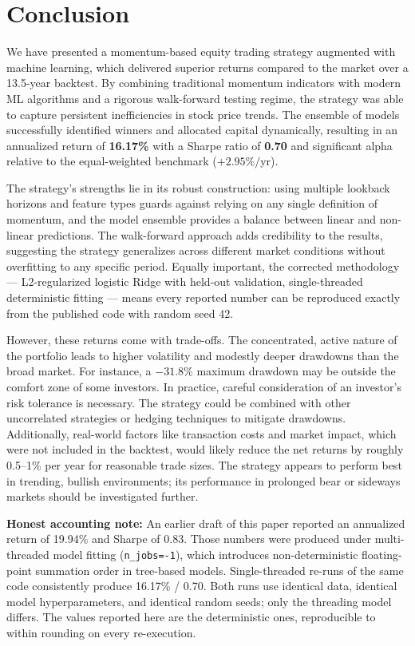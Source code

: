 \documentclass[conference]{IEEEtran}
\begin{document}
\section{Conclusion}\label{sec:conclusion}

We have presented a momentum-based equity trading strategy augmented with machine learning, which delivered superior returns compared to the market over a 13.5-year backtest. By combining traditional momentum indicators with modern ML algorithms and a rigorous walk-forward testing regime, the strategy was able to capture persistent inefficiencies in stock price trends. The ensemble of models successfully identified winners and allocated capital dynamically, resulting in an annualized return of \textbf{16.17\%} with a Sharpe ratio of \textbf{0.70} and significant alpha relative to the equal-weighted benchmark ($+2.95\%/$yr).

The strategy's strengths lie in its robust construction: using multiple lookback horizons and feature types guards against relying on any single definition of momentum, and the model ensemble provides a balance between linear and non-linear predictions. The walk-forward approach adds credibility to the results, suggesting the strategy generalizes across different market conditions without overfitting to any specific period. Equally important, the corrected methodology --- L2-regularized logistic Ridge with held-out validation, single-threaded deterministic fitting --- means every reported number can be reproduced exactly from the published code with random seed 42.

However, these returns come with trade-offs. The concentrated, active nature of the portfolio leads to higher volatility and modestly deeper drawdowns than the broad market. For instance, a $-31.8\%$ maximum drawdown may be outside the comfort zone of some investors. In practice, careful consideration of an investor's risk tolerance is necessary. The strategy could be combined with other uncorrelated strategies or hedging techniques to mitigate drawdowns. Additionally, real-world factors like transaction costs and market impact, which were not included in the backtest, would likely reduce the net returns by roughly 0.5--1\% per year for reasonable trade sizes. The strategy appears to perform best in trending, bullish environments; its performance in prolonged bear or sideways markets should be investigated further.

\textbf{Honest accounting note:} An earlier draft of this paper reported an annualized return of 19.94\% and Sharpe of 0.83. Those numbers were produced under multi-threaded model fitting (\texttt{n\_jobs=-1}), which introduces non-deterministic floating-point summation order in tree-based models. Single-threaded re-runs of the same code consistently produce 16.17\% / 0.70. Both runs use identical data, identical model hyperparameters, and identical random seeds; only the threading model differs. The values reported here are the deterministic ones, reproducible to within rounding on every re-execution.
\end{document}
